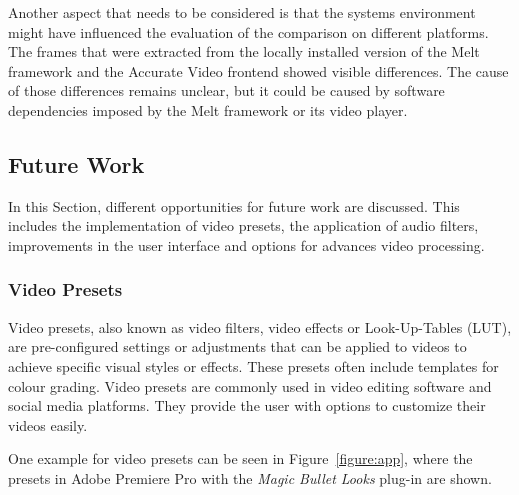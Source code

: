 \documentclass[../MasterThesis.tex]{subfiles}
\begin{document}
Another aspect that needs to be considered is that the systems environment might have influenced the evaluation of the comparison on different platforms. The frames that were extracted from the locally installed version of the Melt framework and the Accurate Video frontend showed visible differences. The cause of those differences remains unclear, but it could be caused by software dependencies imposed by the Melt framework or its video player.

	

	
	
	
	





\subsection{Future Work} \label{subsection:futurework}


In this Section, different opportunities for future work are discussed. This includes the implementation of video presets, the application of audio filters, improvements in the user interface and options for advances video processing.


\subsubsection*{Video Presets}

Video presets, also known as video filters, video effects or Look-Up-Tables (LUT), are pre-configured settings or adjustments that can be applied to videos to achieve specific visual styles or effects. 
These presets often include templates for colour grading. 
Video presets are commonly used in video editing software and social media platforms. They provide the user with options to customize their videos easily.~\cite{cc1}

One example for video presets can be seen in Figure~\ref{figure:app}, where the presets in Adobe Premiere Pro with the \textit{Magic Bullet Looks} plug-in are shown.~\cite{premierepro, magicbullet}
\end{document}
